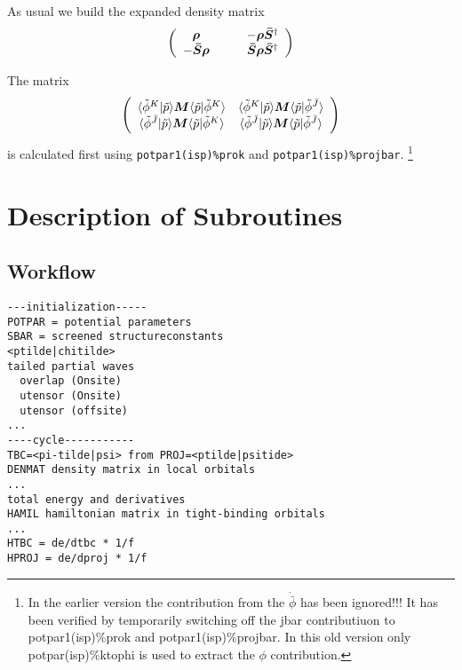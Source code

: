 \documentclass[11pt,a4paper]{report}
\begin{document}
As usual we build the expanded density matrix
\begin{eqnarray}
\left(\begin{array}{cc}
  \bm{\rho} \qquad& 
-\bm{\rho}\bm{\bar{S}}^\dagger\\
-\bm{\bar{S}}\bm{\rho} \qquad& 
\bm{\bar{S}}\bm{\rho}\bm{\bar{S}}^\dagger\\
\end{array}\right)
\end{eqnarray}

The matrix 
\begin{eqnarray}
\left(\begin{array}{cc}
\langle\tilde{\phi}^{K}|\tilde{p}\rangle 
\bm{M}\langle\tilde{p}|\tilde{\phi}^{K}\rangle &
\langle\tilde{\phi}^{K}|\tilde{p}\rangle 
\bm{M}\langle\tilde{p}|\tilde{\phi}^{\bar{J}}\rangle \\
\langle\tilde{\phi}^{\bar{J}}|\tilde{p}\rangle 
\bm{M}\langle\tilde{p}|\tilde{\phi}^{K}\rangle &
\langle\tilde{\phi}^{\bar{J}}|\tilde{p}\rangle 
\bm{M}\langle\tilde{p}|\tilde{\phi}^{\bar{J}}\rangle \\
\end{array}\right)
\end{eqnarray}
is calculated first using \verb|potpar1(isp)%prok| and
\verb|potpar1(isp)%projbar|.
\footnote{ In the earlier version the contribution from the
  $\dot{\bar{\phi}}$ has been ignored!!! It has been verified by
  temporarily switching off the jbar contributiuon to
  potpar1(isp)\%prok and potpar1(isp)\%projbar. In this old version
  only potpar(isp)\%ktophi is used to extract the $\phi$
  contribution.}







\chapter{Description of Subroutines}
\section{Workflow}
\begin{verbatim}
---initialization-----
POTPAR = potential parameters
SBAR = screened structureconstants
<ptilde|chitilde>
tailed partial waves
  overlap (Onsite) 
  utensor (Onsite)
  utensor (offsite)
...
----cycle-----------
TBC=<pi-tilde|psi> from PROJ=<ptilde|psitide>
DENMAT density matrix in local orbitals
...
total energy and derivatives
HAMIL hamiltonian matrix in tight-binding orbitals
...
HTBC = de/dtbc * 1/f
HPROJ = de/dproj * 1/f
\end{verbatim}
\end{document}
